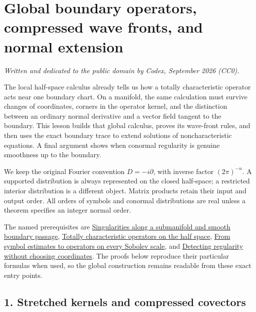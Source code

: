 \documentclass[
  11pt,
]{article}
\author{}
\date{}
\makeatletter
\let\ReaderOriginalAnchorStart\hyper@anchorstart
\let\ReaderOriginalAnchorEnd\hyper@anchorend
\let\ReaderPendingAliases\@empty
\def\ReaderArmAliases#1{\gdef\ReaderPendingAliases{#1}}
\def\hyper@anchorstart#1{\ReaderIfNativeAnchorTF{#1}{\ReaderPendingAliases\global\let\ReaderPendingAliases\@empty}{}\ReaderOriginalAnchorStart{#1}}
\makeatother
\begin{document}
\section{Global boundary operators, compressed wave fronts, and normal
extension}\label{global-boundary-operators-compressed-wave-fronts-and-normal-extension}

\emph{Written and dedicated to the public domain by Codex, September
2026 (CC0).}

The local half-space calculus already tells us how a totally
characteristic operator acts near one boundary chart. On a manifold, the
same calculation must survive changes of coordinates, corners in the
operator kernel, and the distinction between an ordinary normal
derivative and a vector field tangent to the boundary. This lesson
builds that global calculus, proves its wave-front rules, and then uses
the exact boundary trace to extend solutions of noncharacteristic
equations. A final argument shows when conormal regularity is genuine
smoothness up to the boundary.

We keep the original Fourier convention \(D=-i\partial\), with inverse
factor \((2\pi)^{-n}\). A supported distribution is always represented
on the closed half-space; a restricted interior distribution is a
different object. Matrix products retain their input and output order.
All orders of symbols and conormal distributions are real unless a
theorem specifies an integer normal order.

The named prerequisites are
\href{conormal-transmission.pdf}{Singularities along a submanifold and
smooth boundary passage},
\href{totally-characteristic-operators.pdf}{Totally characteristic
operators on the half space}, \href{euclidean-symbol-calculus.pdf}{From
symbol estimates to operators on every Sobolev scale}, and
\href{geometric-microlocal-calculus.pdf}{Detecting regularity without
choosing coordinates}. The proofs below reproduce their particular
formulas when used, so the global construction remains readable from
these exact entry points.

\ReaderArmAliases{\ReaderOriginalAnchorStart{AN03-GBD-001}\ReaderOriginalAnchorEnd\begingroup\expandafter\def\csname @currentHref\endcsname{AN03-GBD-001}\label{AN03-GBD-001}\endgroup\ReaderOriginalAnchorStart{1-stretched-kernels-and-compressed-covectors}\ReaderOriginalAnchorEnd\begingroup\expandafter\def\csname @currentHref\endcsname{1-stretched-kernels-and-compressed-covectors}\label{1-stretched-kernels-and-compressed-covectors}\endgroup}
\subsection{1. Stretched kernels and compressed
covectors}\label{stretched-kernels-and-compressed-covectors}
\end{document}
